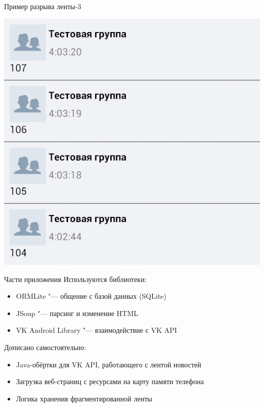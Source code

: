 \documentclass[utf8,xcolor=table]{beamer}
\begin{document}
\begin{frame}[t]{Пример разрыва ленты-3}
	\begin{center}
		\includegraphics[scale=0.5]{c.png}
	\end{center}
\end{frame}

\begin{frame}[t]{Части приложения}
	Используются библиотеки:
	\begin{itemize}
		\item ORMLite "--- общение с базой данных (SQLite)
		\item JSoup "--- парсинг и изменение HTML
		\item VK Android Library "--- взаимодействие с VK API
	\end{itemize}
	Дописано самостоятельно:
	\begin{itemize}
		\item Java-обёртки для VK API, работающего с лентой новостей
		\item Загрузка веб-страниц с ресурсами на карту памяти телефона
		\item Логика хранения фрагментированной ленты
	\end{itemize}
\end{frame}
\end{document}
